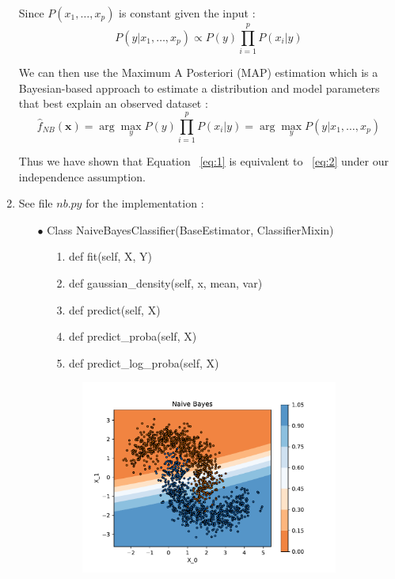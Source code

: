 \documentclass[acmconf,nonacm=true]{acmart}
\begin{document}
\begin{enumerate}
   Since $P(x_1, \dots, x_p)$ is constant given the input :
   $$ P(y|x_1, \dots, x_p) \propto P(y) \prod_{i=1}^{p} P(x_i|y)$$

   We can then use the Maximum A Posteriori (MAP) estimation which is a Bayesian-based approach to estimate a distribution and model parameters that best explain an observed dataset :
   $$ \hat{f}_{NB}(\mathbf{x}) = \arg \max_y P(y) \prod_{i=1}^{p} P(x_i|y) = \arg \max_y P(y|x_1, \dots, x_p)$$

   Thus we have shown that Equation ~\ref{eq:1} is equivalent to ~\ref{eq:2} under our independence assumption.
   
    \item
    See file \( nb.py \) for the implementation :
    \begin{enumerate}
        \item[$\bullet$] Class NaiveBayesClassifier(BaseEstimator, ClassifierMixin)
        \begin{enumerate}
            \item[1.] def fit(self, X, Y)
            \item[2.] def gaussian\_density(self, x, mean, var)
            \item[3.] def predict(self, X)
            \item[4.] def predict\_proba(self, X)
            \item[5.] def predict\_log\_proba(self, X)
        \end{enumerate}
    \end{enumerate}
    \begin{figure}[h]
            \centering
            \begin{subfigure}[b]{0.5\textwidth}
                \includegraphics[width=\textwidth]{naive_bayes_nbg.pdf}

\end{subfigure}
\end{figure}
\end{enumerate}
\end{document}
